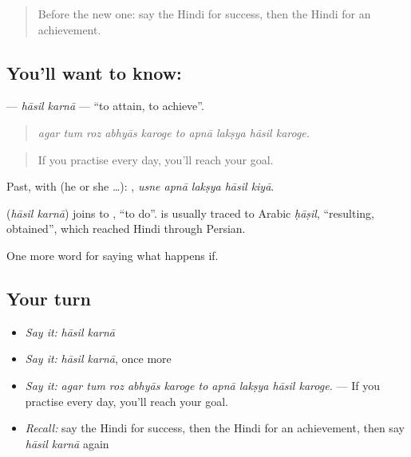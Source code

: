 \begin{quote}
Before the new one: say the Hindi for success, then the Hindi for an achievement.
\end{quote}

\subsection*{You'll want to know:  }
\textbf{ } — \emph{hāsil karnā} — \textquotedblleft{}to attain, to achieve\textquotedblright{}.

\begin{quote}
         
\end{quote}

\begin{quote}
\emph{agar tum roz abhyās karoge to apnā lakṣya hāsil karoge.}
\end{quote}

\begin{quote}
If you practise every day, you'll reach your goal.
\end{quote}

Past, with  (he or she …):     , \emph{usne apnā lakṣya hāsil kiyā}.

\begin{cousinweb}
\textbf{ } (\emph{hāsil karnā}) joins  to , \textquotedblleft{}to do\textquotedblright{}.  is usually traced to Arabic \emph{ḥāṣil}, \textquotedblleft{}resulting, obtained\textquotedblright{}, which reached Hindi through Persian.
\end{cousinweb}

\begin{grammarlens}[title={What you've built}]
One more word for saying what happens if.
\end{grammarlens}

\subsection*{Your turn}
\begin{itemize}
\raggedright
  \item \emph{Say it:} \emph{hāsil karnā}
  \item \emph{Say it:} \emph{hāsil karnā}, once more
  \item \emph{Say it:} \emph{agar tum roz abhyās karoge to apnā lakṣya hāsil karoge.} — If you practise every day, you'll reach your goal.
  \item \emph{Recall:} say the Hindi for success, then the Hindi for an achievement, then say \emph{hāsil karnā} again
\end{itemize}

